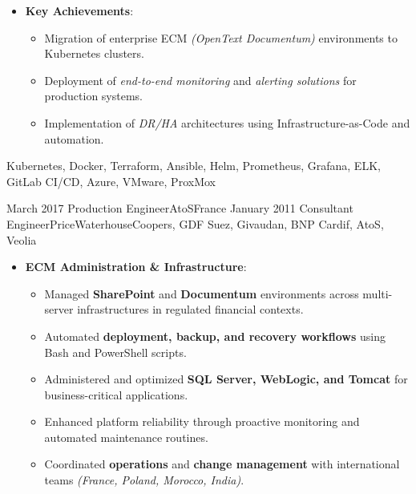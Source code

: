 \begin{experiences}
{\begin{itemize}[left=0pt,label={},itemsep=0.5em]
          \item \textbf{Key Achievements}:
            \begin{itemize}[itemsep=0.2em,topsep=0.2em,parsep=0pt]
              \small
              \item Migration of enterprise ECM \emph{(OpenText Documentum)} environments to Kubernetes clusters.
              \item Deployment of \emph{end-to-end monitoring} and \emph{alerting solutions} for production systems.
              \item Implementation of \emph{DR/HA} architectures using Infrastructure-as-Code and automation.
            \end{itemize}
        \end{itemize}
        \vspace{0.5em}  %
    }
    {Kubernetes, Docker, Terraform, Ansible, Helm, Prometheus, Grafana, ELK, GitLab CI/CD, Azure, VMware, ProxMox}

\emptySeparator
\emptySeparator

\consultantexperience
    {March 2017}       {Production Engineer}{AtoS}{France}
    {January 2011}    {Consultant Engineer}{PriceWaterhouseCoopers, GDF Suez, Givaudan, BNP Cardif, AtoS, Veolia} {
        \begin{itemize}[left=0pt,label={},itemsep=0.4em]
        \vspace{0.5em}  %
          \item \textbf{ECM Administration \& Infrastructure}:
            \begin{itemize}[itemsep=0.15em,topsep=0.1em,parsep=0pt]
              \small
              \item Managed \textbf{SharePoint} and \textbf{Documentum} environments across multi-server infrastructures in regulated financial contexts.
              \item Automated \textbf{deployment, backup, and recovery workflows} using Bash and PowerShell scripts.
              \item Administered and optimized \textbf{SQL Server, WebLogic, and Tomcat} for business-critical applications.
              \item Enhanced platform reliability through proactive monitoring and automated maintenance routines.
              \item Coordinated \textbf{operations} and \textbf{change management} with international teams \emph{(France, Poland, Morocco, India)}.
            \end{itemize}


\end{itemize}}
\end{experiences}
